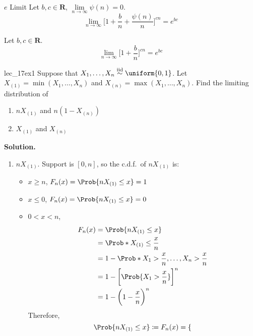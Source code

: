 \begin{Theorem}{$ e $ Limit}{}
    Let $ b,c\in\mathbf{R} $, $ \lim\limits_{{n} \to {\infty}} \psi(n)=0 $.
    \[ \lim\limits_{{n} \to {\infty}}
        \biggr[1+\frac{b}{n} +\frac{\psi(n)}{n} \biggl]^{c n}=e^{b c} \]
\end{Theorem}
\begin{Corollary}{}{}
    Let $ b,c\in\mathbf{R} $.
    \[ \lim\limits_{{n} \to {\infty}}
        \biggl[1+\frac{b}{n}\biggr]^{c n}=e^{b c} \]
\end{Corollary}
\begin{Example}{}{lec_17ex1}
    Suppose that $ X_1,\ldots,X_n\stackrel{\text{iid}}{\sim}
        \uniform{0,1} $. Let $ X_{(1)}=\min(X_1,\ldots,X_n) $
    and $ X_{(n)}=\max(X_1,\ldots,X_n) $. Find the
    limiting distribution of
    \begin{enumerate}[label=(\roman*)]
        \item $ nX_{(1)} $ and $ n(1-X_{(n)}) $
        \item $ X_{(1)} $ and $ X_{(n)} $
    \end{enumerate}
    \textbf{Solution.}
    \begin{enumerate}[label=(\roman*)]
        \item $ nX_{(1)} $. Support is
              $ [0,n] $, so the c.d.f.\ of $ nX_{(1)} $ is:
              \begin{itemize}
                  \item $ x\ge n $, $ F_n(x)=\Prob{n X_{(1)}\le x}=1 $
                  \item $ x\le 0 $, $ F_n(x)=\Prob{n X_{(1)}\le x}=0 $
                  \item $ 0<x<n $,
                        \begin{align*}
                            F_n(x)
                             & =\Prob{n X_{(1)}\le x}                            \\
                             & =\Prob*{X_{(1)}\le \frac{x}{n}}                   \\
                             & =1-\Prob*{X_1>\frac{x}{n},\ldots,X_n>\frac{x}{n}} \\
                             & =1-\biggl[\Prob{X_1>\frac{x}{n}}\biggr]^n         \\
                             & =1-\biggl(1-\frac{x}{n} \biggr)^n
                        \end{align*}
                        Therefore,
                        \[ \Prob{nX_{(1)}\le x}\coloneq
                            F_n(x)=\begin{dcases}

\end{dcases}\]
\end{itemize}
\end{enumerate}
\end{Example}
